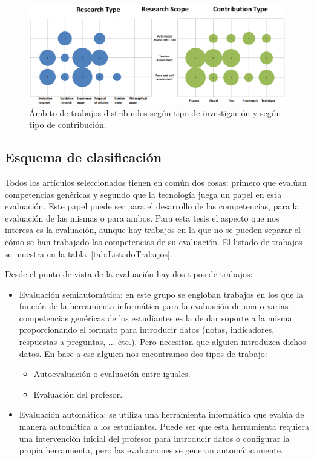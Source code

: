 \pagestyle{empty}
\begin{landscape}
\begin{figure}[H]
  \begin{center}
    \includegraphics[scale=0.4]{Burbujas.png}
  \end{center}
  \caption{Ámbito de trabajos distribuidos según tipo de investigación y según tipo de contribución.}
  \label{fig:Burble}
\end{figure}
\end{landscape}
\pagestyle{fancy}


\subsection{Esquema de clasificación}

Todos los artículos seleccionados tienen en común dos cosas: primero que evalúan competencias genéricas y segundo que la tecnología juega un papel en esta evaluación. Este papel puede ser para el desarrollo de las competencias, para la evaluación de las mismas o para ambos. Para esta tesis el aspecto que nos interesa es la evaluación, aunque hay trabajos en la que no se pueden separar el cómo se han trabajado las competencias de su evaluación. El listado de trabajos se muestra en la tabla~\ref{tab:ListadoTrabajos}.

Desde el punto de vista de la evaluación hay dos tipos de trabajos:
\begin{itemize}
\item Evaluación semiautomática: en este grupo se engloban trabajos en los que la función de la herramienta informática para la evaluación de una o varias competencias genéricas de los estudiantes es la de dar soporte a la misma proporcionando el formato para introducir datos (notas, indicadores, respuestas a preguntas, ... etc.). Pero necesitan que alguien introduzca dichos datos. En base a ese alguien nos encontramos dos tipos de trabajo:
	\begin{itemize}
		\item Autoevaluación o evaluación entre iguales.
		\item Evaluación del profesor.
	\end{itemize}
\item Evaluación automática:  se utiliza una herramienta informática que evalúa de manera automática a los estudiantes. Puede ser que esta herramienta requiera una intervención inicial del profesor para introducir datos o configurar la propia herramienta, pero las evaluaciones se generan automáticamente.
\end{itemize}

